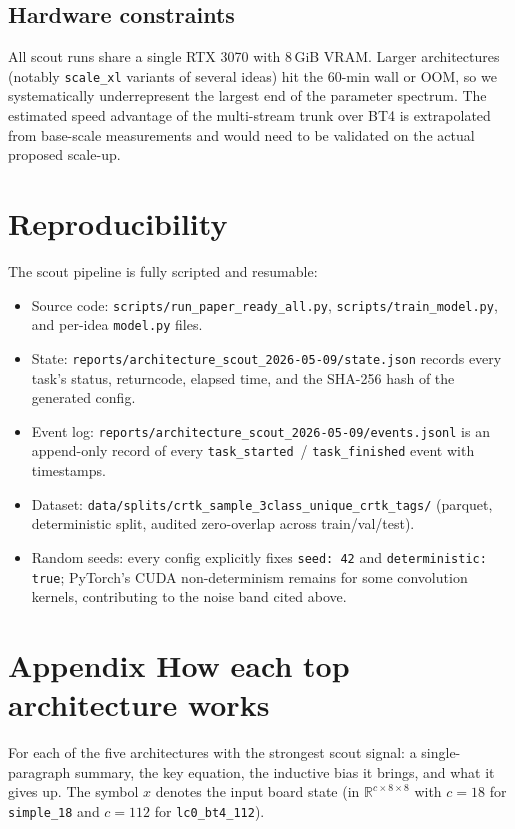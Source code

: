 \documentclass[10pt,a4paper]{article}
\begin{document}
\subsection*{Hardware constraints}
All scout runs share a single RTX 3070 with 8\,GiB VRAM. Larger architectures
(notably \texttt{scale\_xl} variants of several ideas) hit the 60-min wall
or OOM, so we systematically underrepresent the largest end of the
parameter spectrum. The estimated speed advantage of the multi-stream trunk
over BT4 is extrapolated from base-scale measurements and would need to be
validated on the actual proposed scale-up.

\section{Reproducibility}

The scout pipeline is fully scripted and resumable:

\begin{itemize}
\item Source code: \texttt{scripts/run\_paper\_ready\_all.py},
  \texttt{scripts/train\_model.py}, and per-idea \texttt{model.py} files.
\item State: \texttt{reports/architecture\_scout\_2026-05-09/state.json}
  records every task's status, returncode, elapsed time, and the SHA-256
  hash of the generated config.
\item Event log: \texttt{reports/architecture\_scout\_2026-05-09/events.jsonl}
  is an append-only record of every \texttt{task\_started}~/
  \texttt{task\_finished} event with timestamps.
\item Dataset: \texttt{data/splits/crtk\_sample\_3class\_unique\_crtk\_tags/}
  (parquet, deterministic split, audited zero-overlap across train/val/test).
\item Random seeds: every config explicitly fixes \texttt{seed: 42} and
  \texttt{deterministic: true}; PyTorch's CUDA non-determinism remains for
  some convolution kernels, contributing to the noise band cited above.
\end{itemize}

\clearpage
\section{Appendix \textperiodcentered{} How each top architecture works}

For each of the five architectures with the strongest scout signal: a
single-paragraph summary, the key equation, the inductive bias it brings,
and what it gives up. The symbol $x$ denotes the input board state
(in $\mathbb{R}^{c \times 8 \times 8}$ with $c=18$ for \texttt{simple\_18}
and $c=112$ for \texttt{lc0\_bt4\_112}).
\end{document}
